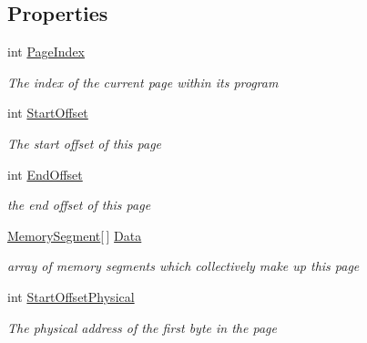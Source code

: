 \subsection*{Properties}
\begin{DoxyCompactItemize}
\item 
int \hyperlink{class_c_p_u___o_s___simulator_1_1_memory_1_1_memory_page_aec80700d036a447e7e6ec204513e3a59}{Page\+Index}
\begin{DoxyCompactList}\small\item\em The index of the current page within its program \end{DoxyCompactList}\item 
int \hyperlink{class_c_p_u___o_s___simulator_1_1_memory_1_1_memory_page_ad700979e51dd3d05470c681588c6fa79}{Start\+Offset}
\begin{DoxyCompactList}\small\item\em The start offset of this page \end{DoxyCompactList}\item 
int \hyperlink{class_c_p_u___o_s___simulator_1_1_memory_1_1_memory_page_abe850b4a088a820ecf598af1cd9a7deb}{End\+Offset}
\begin{DoxyCompactList}\small\item\em the end offset of this page \end{DoxyCompactList}\item 
\hyperlink{class_c_p_u___o_s___simulator_1_1_memory_1_1_memory_segment}{Memory\+Segment}\mbox{[}$\,$\mbox{]} \hyperlink{class_c_p_u___o_s___simulator_1_1_memory_1_1_memory_page_a8bf84e82146f9ff35ffbcc32b93a9db0}{Data}
\begin{DoxyCompactList}\small\item\em array of memory segments which collectively make up this page \end{DoxyCompactList}\item 
int \hyperlink{class_c_p_u___o_s___simulator_1_1_memory_1_1_memory_page_af31a2243a3e68ec635315929859fa358}{Start\+Offset\+Physical}
\begin{DoxyCompactList}\small\item\em The physical address of the first byte in the page \end{DoxyCompactList}\end{DoxyCompactItemize}
